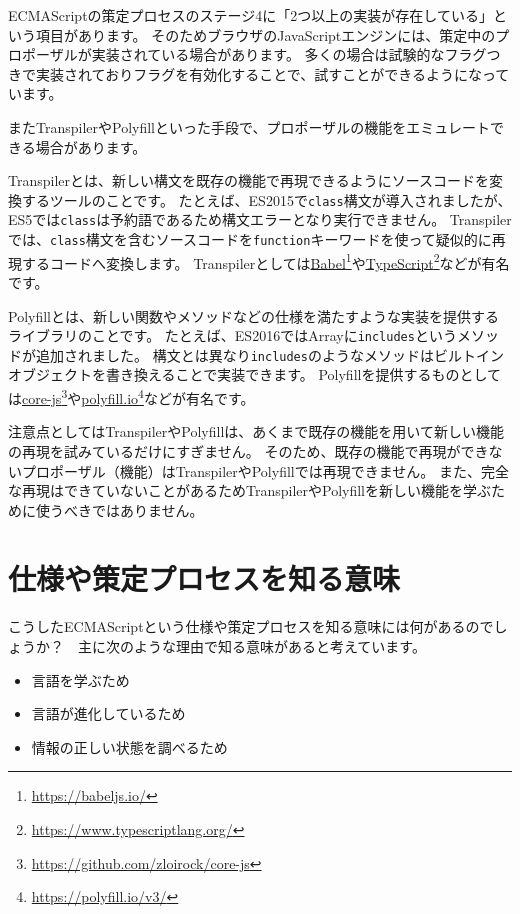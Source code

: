 ECMAScriptの策定プロセスのステージ4に「2つ以上の実装が存在している」という項目があります。
そのためブラウザのJavaScriptエンジンには、策定中のプロポーザルが実装されている場合があります。
多くの場合は試験的なフラグつきで実装されておりフラグを有効化することで、試すことができるようになっています。

またTranspilerやPolyfillといった手段で、プロポーザルの機能をエミュレートできる場合があります。

Transpilerとは、新しい構文を既存の機能で再現できるようにソースコードを変換するツールのことです。
たとえば、ES2015で\texttt{class}構文が導入されましたが、ES5では\texttt{class}は予約語であるため構文エラーとなり実行できません。
Transpilerでは、\texttt{class}構文を含むソースコードを\texttt{function}キーワードを使って疑似的に再現するコードへ変換します。
Transpilerとしては\href{https://babeljs.io/}{Babel}\footnote{\url{https://babeljs.io/}}や\href{https://www.typescriptlang.org/}{TypeScript}\footnote{\url{https://www.typescriptlang.org/}}などが有名です。

Polyfillとは、新しい関数やメソッドなどの仕様を満たすような実装を提供するライブラリのことです。
たとえば、ES2016ではArrayに\texttt{includes}というメソッドが追加されました。
構文とは異なり\texttt{includes}のようなメソッドはビルトインオブジェクトを書き換えることで実装できます。
Polyfillを提供するものとしては\href{https://github.com/zloirock/core-js}{core-js}\footnote{\url{https://github.com/zloirock/core-js}}や\href{https://polyfill.io/v3/}{polyfill.io}\footnote{\url{https://polyfill.io/v3/}}などが有名です。

注意点としてはTranspilerやPolyfillは、あくまで既存の機能を用いて新しい機能の再現を試みているだけにすぎません。
そのため、既存の機能で再現ができないプロポーザル（機能）はTranspilerやPolyfillでは再現できません。
また、完全な再現はできていないことがあるためTranspilerやPolyfillを新しい機能を学ぶために使うべきではありません。

\hypertarget{meaning-specification-process}{%
\section{仕様や策定プロセスを知る意味}\label{meaning-specification-process}}

こうしたECMAScriptという仕様や策定プロセスを知る意味には何があるのでしょうか？　主に次のような理由で知る意味があると考えています。

\begin{itemize}
\item
  言語を学ぶため
\item
  言語が進化しているため
\item
  情報の正しい状態を調べるため
\end{itemize}

